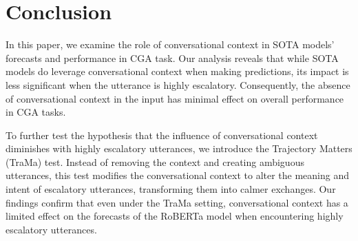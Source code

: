 \section{Conclusion}
In this paper, we examine the role of conversational context in SOTA models' forecasts and performance in CGA task. 
%
Our analysis reveals that while SOTA models do leverage conversational context when making predictions, its impact is less significant when the utterance is highly escalatory. 
%
Consequently, the absence of conversational context in the input has minimal effect on overall performance in CGA tasks.

To further test the hypothesis that the influence of conversational context diminishes with highly escalatory utterances, we introduce the Trajectory Matters (TraMa) test. 
%
Instead of removing the context and creating ambiguous utterances, this test modifies the conversational context to alter the meaning and intent of escalatory utterances, transforming them into calmer exchanges. 
%
Our findings confirm that even under the TraMa setting, conversational context has a limited effect on the forecasts of the RoBERTa model when encountering highly escalatory utterances.
